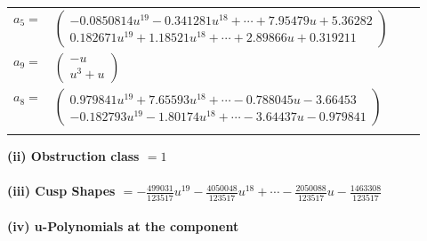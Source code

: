 \documentclass[1p]{elsarticle_modified}
\theoremstyle{definition}
\begin{document}
\begin{tabular}{m{7pt} m{180pt} m{7pt} m{180pt} }
\flushright $a_{5}=$&$\begin{pmatrix}-0.0850814 u^{19}-0.341281 u^{18}+\cdots+7.95479 u+5.36282\\0.182671 u^{19}+1.18521 u^{18}+\cdots+2.89866 u+0.319211\end{pmatrix}$ \\
\flushright $a_{9}=$&$\begin{pmatrix}- u\\u^3+u\end{pmatrix}$ \\
\flushright $a_{8}=$&$\begin{pmatrix}0.979841 u^{19}+7.65593 u^{18}+\cdots-0.788045 u-3.66453\\-0.182793 u^{19}-1.80174 u^{18}+\cdots-3.64437 u-0.979841\end{pmatrix}$\\&\end{tabular}
\flushleft \textbf{(ii) Obstruction class $= 1$}\\~\\
\flushleft \textbf{(iii) Cusp Shapes $= -\frac{499031}{123517} u^{19}-\frac{4050048}{123517} u^{18}+\cdots-\frac{2050088}{123517} u-\frac{1463308}{123517}$}\\~\\
\newpage\renewcommand{\arraystretch}{1}
\flushleft \textbf{(iv) u-Polynomials at the component}\newline \\
\end{document}
